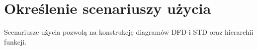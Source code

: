 \section{Określenie scenariuszy użycia}
Scenariusze użycia pozwolą na konstrukcję diagramów
DFD i STD oraz hierarchii funkcji.
